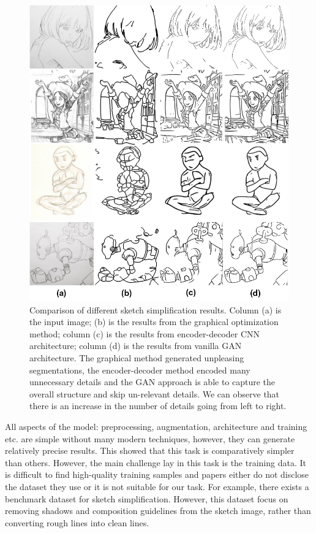 \begin{figure}
    \centering
    \includegraphics[width=1.0\textwidth]{images/sketch/sketch-simp-works.png}
    \caption[Comparison of different sketch simplification results.]{Comparison of different sketch simplification results. Column (a) is the input image; (b) is the results from the graphical optimization method; column (c) is the results from encoder-decoder CNN architecture; column (d) is the results from vanilla GAN architecture. The graphical method generated unpleasing segmentations, the encoder-decoder method encoded many unnecessary details and the GAN approach is able to capture the overall structure and skip un-relevant details. We can observe that there is an increase in the number of details going from left to right.\cite{simo-serraMasteringSketchingAdversarial2017}}
    \label{fig:sketch-simp-works}
\end{figure}

All aspects of the model: preprocessing, augmentation, architecture and training etc. are simple without many modern techniques, however, they can generate relatively precise results. This showed that this task is comparatively simpler than others. However, the main challenge lay in this task is the training data. It is difficult to find high-quality training samples and papers either do not disclose the dataset they use or it is not suitable for our task. For example, there exists a benchmark dataset for sketch simplification\cite{yanBenchmarkRoughSketch2020}. However, this dataset focus on removing shadows and composition guidelines from the sketch image, rather than converting rough lines into clean lines.

